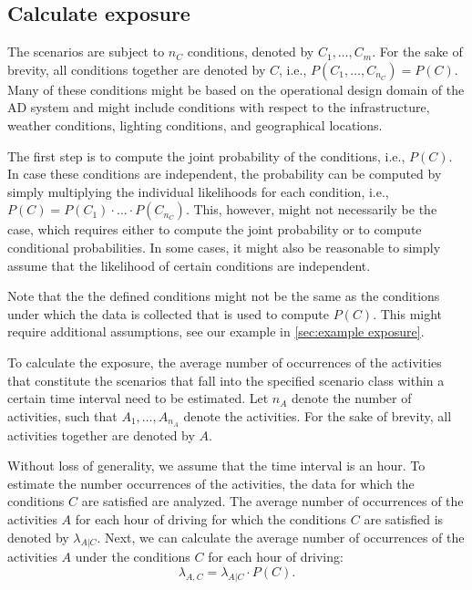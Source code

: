 \subsection{Calculate exposure}
\label{sec:exposure}

The scenarios are subject to $n_C$ conditions, denoted by $C_1, \ldots, C_m$. For the sake of brevity, all conditions together are denoted by $C$, i.e., $P(C_1, \ldots, C_{n_C})=P(C)$. Many of these conditions might be based on the operational design domain of the AD system and might include conditions with respect to the infrastructure, weather conditions, lighting conditions, and geographical locations. 

The first step is to compute the joint probability of the conditions, i.e., $P(C)$. In case these conditions are independent, the probability can be computed by simply multiplying the individual likelihoods for each condition, i.e., $P(C)=P(C_1)\cdot\ldots\cdot P(C_{n_C})$. This, however, might not necessarily be the case, which requires either to compute the joint probability or to compute conditional probabilities. In some cases, it might also be reasonable to simply assume that the likelihood of certain conditions are independent.

Note that the the defined conditions might not be the same as the conditions under which the data is collected that is used to compute $P(C)$. This might require additional assumptions, see our example in \cref{sec:example exposure}.

To calculate the exposure, the average number of occurrences of the activities that constitute the scenarios that fall into the specified scenario class within a certain time interval need to be estimated. Let $n_A$ denote the number of activities, such that $A_1, \ldots, A_{n_A}$ denote the activities. For the sake of brevity, all activities together are denoted by $A$. 

Without loss of generality, we assume that the time interval is an hour. To estimate the number occurrences of the activities, the data for which the conditions $C$ are satisfied are analyzed. The average number of occurrences of the activities $A$ for each hour of driving for which the conditions $C$ are satisfied is denoted by $\lambda_{A|C}$. Next, we can calculate the average number of occurrences of the activities $A$ under the conditions $C$ for each hour of driving:
\begin{equation}
	\lambda_{A,C} = \lambda_{A|C} \cdot P(C).
\end{equation}

